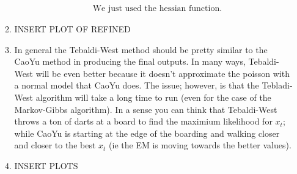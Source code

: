 \documentclass[paper=a4, fontsize=11pt]{scrartcl}
\begin{document}
\begin{enumerate}
\begin{enumerate}[1]
\begin{align*}
        & \text { We just used the hessian function. }
      \end{align*}
      \item INSERT PLOT OF REFINED
      \item In general the Tebaldi-West method should be pretty similar to the CaoYu method in producing the final outputs. In many ways, Tebaldi-West will be even better because it doesn't approximate the poisson with a normal model that CaoYu does. The issue; however, is that the Tebladi-West algorithm will take a long time to run (even for the case of the Markov-Gibbs algorithm). In a sense you can think that Tebaldi-West throws a ton of darts at a board to find the maximium likelihood for $x_t$; while CaoYu is starting at the edge of the boarding and walking closer and closer to the best $x_t$ (ie the EM is moving towards the better values).
      \item INSERT PLOTS
    \end{enumerate}
\end{enumerate}
\end{document}
